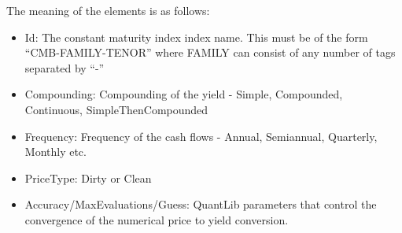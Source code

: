 The meaning of the elements is as follows:

\begin{itemize}
\item Id: The constant maturity index index name. This must be of the form ``CMB-FAMILY-TENOR'' where FAMILY can consist of any number of tags separated by ``-''
\item Compounding: Compounding of the yield - Simple, Compounded, Continuous, SimpleThenCompounded
\item Frequency: Frequency of the cash flows - Annual, Semiannual, Quarterly, Monthly etc.
\item PriceType: Dirty or Clean
\item Accuracy/MaxEvaluations/Guess: QuantLib parameters that control the convergence of the numerical price to yield conversion.
\end{itemize}
